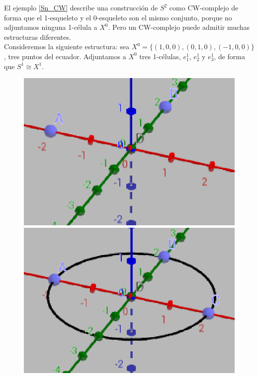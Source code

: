 \begin{ejem} El ejemplo \ref{Sn_CW} describe una construcción de $S^2$ como CW-complejo de forma que el 1-esqueleto y el 0-esqueleto son el mismo conjunto, porque no adjuntamos ninguna 1-célula a $X^0$. Pero un CW-complejo puede admitir muchas estructuras diferentes. 
\\

Consideremos la siguiente estructura: sea $X^0=\{(1,0,0), (0,1,0), (-1,0,0)\}$, tres puntos del ecuador. Adjuntamos a $X^0$ tres 1-células, $e^1_1$, $e^1_2$ y $e^1_3$, de forma que $S^1\cong X^1$.

\begin{figure}[h]
\centering
\includegraphics[scale=0.71]{Figures/S2paso1}
\includegraphics[scale=0.7]{Figures/S2paso2}
\end{figure}


\end{ejem}
